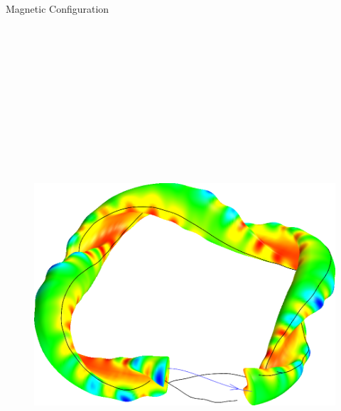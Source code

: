 \documentclass{beamer}
\newlength{\onecolwid}
\begin{document}
\begin{frame}[t]
\begin{columns}[t]
\begin{column}{\onecolwid}
\begin{block}{Magnetic Configuration}
\begin{figure}
	\resizebox{1.0\textwidth}{!}
	{
		\includegraphics[trim={0 0 0 -0.5cm},clip,height=20cm]{../Graphics/magnetic_field_2.png}
		\quad
}
\end{figure}
\end{block}
\end{column}
\end{columns}
\end{frame}
\end{document}
